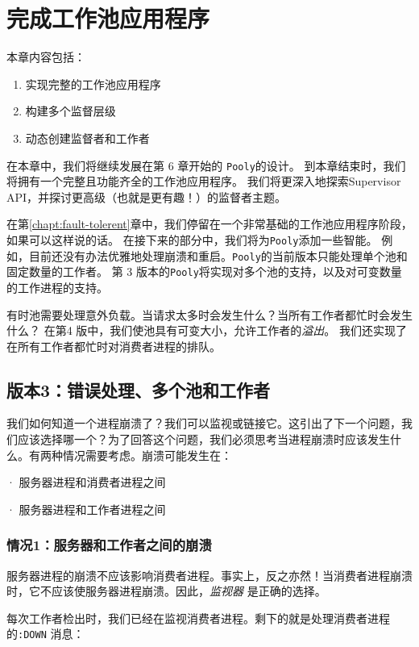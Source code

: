 \chapter{完成工作池应用程序}\label{chapt:worker-pool}

本章内容包括：

\begin{enumerate}
	\item 实现完整的工作池应用程序
  \item 构建多个监督层级
  \item 动态创建监督者和工作者
\end{enumerate}

在本章中，我们将继续发展在第 6 章开始的 \texttt{Pooly}的设计。
到本章结束时，我们将拥有一个完整且功能齐全的工作池应用程序。
我们将更深入地探索Supervisor API，并探讨更高级（也就是更有趣！）的监督者主题。

在第\ref{chapt:fault-tolerent}章中，我们停留在一个非常基础的工作池应用程序阶段，如果可以这样说的话。
在接下来的部分中，我们将为\texttt{Pooly}添加一些智能。
例如，目前还没有办法优雅地处理崩溃和重启。\texttt{Pooly}的当前版本只能处理单个池和固定数量的工作者。
第 3 版本的\texttt{Pooly}将实现对多个池的支持，以及对可变数量的工作进程的支持。

有时池需要处理意外负载。当请求太多时会发生什么？当所有工作者都忙时会发生什么？
在第4 版中，我们使池具有可变大小，允许工作者的\emph{溢出}。
我们还实现了在所有工作者都忙时对消费者进程的排队。

\section{版本3：错误处理、多个池和工作者}

我们如何知道一个进程崩溃了？我们可以监视或链接它。这引出了下一个问题，我们应该选择哪一个？为了回答这个问题，我们必须思考当进程崩溃时应该发生什么。有两种情况需要考虑。崩溃可能发生在：

· 服务器进程和消费者进程之间

· 服务器进程和工作者进程之间


\subsection{情况1：服务器和工作者之间的崩溃}

服务器进程的崩溃不应该影响消费者进程。事实上，反之亦然！当消费者进程崩溃时，它不应该使服务器进程崩溃。因此，\emph{监视器}
是正确的选择。

每次工作者检出时，我们已经在监视消费者进程。剩下的就是处理消费者进程的\texttt{:DOWN} 消息：


